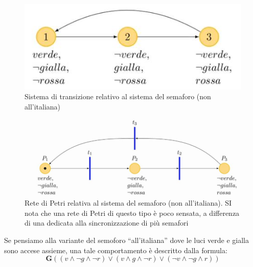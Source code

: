 \documentclass[a4paper,12pt, oneside]{book}
\begin{document}
\begin{figure}[H]
  \centering
  \includegraphics[scale = 0.5]{img/semp.jpg}
  \caption{Sistema di transizione relativo al sistema del semaforo (non
    all'italiana)} 
\end{figure}
\begin{figure}[H]
  \centering
  \includegraphics[scale = 0.45]{img/semp2.jpg}
  \caption{Rete di Petri relativa al sistema del semaforo (non all'italiana). SI
    nota che una rete di Petri di questo tipo è poco sensata, a differenza di una
    dedicata alla sincronizzazione di più semafori}
\end{figure}
Se pensiamo alla variante del semoforo ``all'italiana'' dove le luci verde e
gialla sono accese assieme, una tale comportamento è descritto dalla formula:
\[\mathbf{G}((v\land \neg g\land\neg r)\lor(v\land g\land \neg r)\lor(\neg
  v\land \neg g\land r))\]
\newpage
\end{document}
